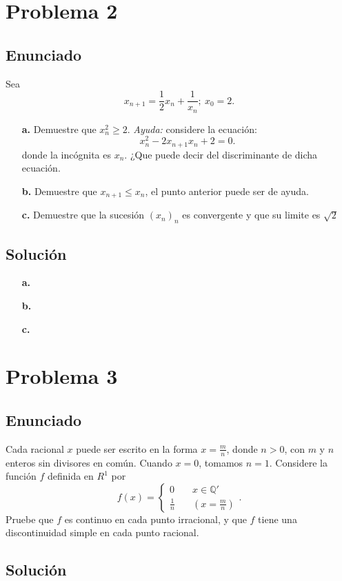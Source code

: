 \documentclass{report}
\begin{document}
\chapter{Problema 2}
\section{Enunciado}
Sea \[
x_{n+1} = \frac{1}{2}x_n + \frac{1}{x_n};\ x_0 = 2
.\] 
\begin{enumerate}
  \item[\textbf{a.}] Demuestre que $x_n^2\ge 2$. \textit{Ayuda:} considere la ecuación: \[
  x_n^2 - 2x_{n+1}x_n + 2 = 0
.\] donde la incógnita es $x_n$. ¿Que puede decir del discriminante de dicha ecuación.
  \item[\textbf{b.}] Demuestre que $x_{n+1}\le x_n$, el punto anterior puede ser de ayuda.
  \item[\textbf{c.}] Demuestre que la sucesión $\left( x_n \right)_n$ es convergente y que su limite es $\sqrt{2} $
\end{enumerate}
\section{Solución}

\begin{enumerate}
  \item[\textbf{a.}] %
  \item[\textbf{b.}] %
  \item[\textbf{c.}] %
\end{enumerate}


\chapter{Problema 3}
\section{Enunciado}
Cada racional $x$ puede ser escrito en la forma $x = \frac{m}{n}$, donde $n > 0$, con $m$ y $n$ enteros sin divisores en común. Cuando $x = 0$, tomamos $n = 1$. Considere la función $f$ definida en $R^{1}$ por \[
f(x) =
\begin{cases}
  0&\quad x\in \mathbb{Q}'\\
  \frac{1}{n}&\quad \left( x = \frac{m}{n} \right) 
\end{cases}
.\] Pruebe que $f$ es continuo en cada punto irracional, y que $f$ tiene una discontinuidad simple en cada punto racional.
\section{Solución}
\end{document}
